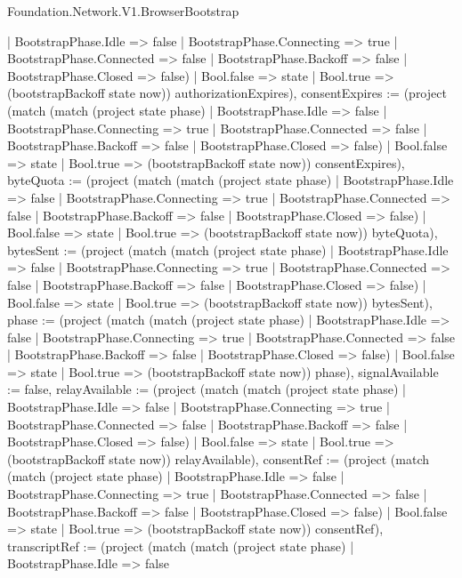\begin{lexlean}{Foundation.Network.V1.BrowserBootstrap}
\begin{semanticmodule}
{{        | BootstrapPhase.Idle => false
        | BootstrapPhase.Connecting => true
        | BootstrapPhase.Connected => false
        | BootstrapPhase.Backoff => false
        | BootstrapPhase.Closed => false)
      | Bool.false => state
      | Bool.true => (bootstrapBackoff state now)) authorizationExpires), consentExpires := (project (match (match (project state phase)
        | BootstrapPhase.Idle => false
        | BootstrapPhase.Connecting => true
        | BootstrapPhase.Connected => false
        | BootstrapPhase.Backoff => false
        | BootstrapPhase.Closed => false)
      | Bool.false => state
      | Bool.true => (bootstrapBackoff state now)) consentExpires), byteQuota := (project (match (match (project state phase)
        | BootstrapPhase.Idle => false
        | BootstrapPhase.Connecting => true
        | BootstrapPhase.Connected => false
        | BootstrapPhase.Backoff => false
        | BootstrapPhase.Closed => false)
      | Bool.false => state
      | Bool.true => (bootstrapBackoff state now)) byteQuota), bytesSent := (project (match (match (project state phase)
        | BootstrapPhase.Idle => false
        | BootstrapPhase.Connecting => true
        | BootstrapPhase.Connected => false
        | BootstrapPhase.Backoff => false
        | BootstrapPhase.Closed => false)
      | Bool.false => state
      | Bool.true => (bootstrapBackoff state now)) bytesSent), phase := (project (match (match (project state phase)
        | BootstrapPhase.Idle => false
        | BootstrapPhase.Connecting => true
        | BootstrapPhase.Connected => false
        | BootstrapPhase.Backoff => false
        | BootstrapPhase.Closed => false)
      | Bool.false => state
      | Bool.true => (bootstrapBackoff state now)) phase), signalAvailable := false, relayAvailable := (project (match (match (project state phase)
        | BootstrapPhase.Idle => false
        | BootstrapPhase.Connecting => true
        | BootstrapPhase.Connected => false
        | BootstrapPhase.Backoff => false
        | BootstrapPhase.Closed => false)
      | Bool.false => state
      | Bool.true => (bootstrapBackoff state now)) relayAvailable), consentRef := (project (match (match (project state phase)
        | BootstrapPhase.Idle => false
        | BootstrapPhase.Connecting => true
        | BootstrapPhase.Connected => false
        | BootstrapPhase.Backoff => false
        | BootstrapPhase.Closed => false)
      | Bool.false => state
      | Bool.true => (bootstrapBackoff state now)) consentRef), transcriptRef := (project (match (match (project state phase)
        | BootstrapPhase.Idle => false
}}
\end{semanticmodule}
\end{lexlean}
